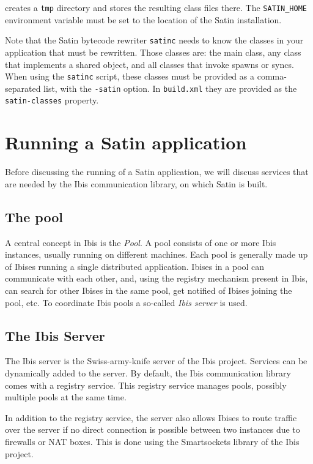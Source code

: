 \documentclass[a4paper,10pt]{article}
\begin{document}
creates a \texttt{tmp} directory and stores the resulting class files there.
The \texttt{SATIN\_HOME} environment variable must be set to the location of
the Satin installation.

Note that the Satin bytecode rewriter \texttt{satinc} needs to know the
classes in your application that must be rewritten.
Those classes are: the main class, any class that implements a shared object,
and all classes that invoke spawns or syncs.
When using the \texttt{satinc} script, these classes must be provided as
a comma-separated list, with the \texttt{-satin} option. In
\texttt{build.xml} they are provided as the \texttt{satin-classes} property.

\section{Running a Satin application}

Before discussing
the running of a Satin application, we will discuss services that are
needed by the Ibis communication library, on which Satin is built.

\subsection{The pool}

A central concept in Ibis is the \emph{Pool}. A pool consists of one or
more Ibis instances, usually running on different machines. Each pool is
generally made up of Ibises running a single distributed application.
Ibises in a pool can communicate with each other, and, using the
registry mechanism present in Ibis, can search for other Ibises in the
same pool, get notified of Ibises joining the pool, etc. To
coordinate Ibis pools a so-called \emph{Ibis server} is used.

\subsection{The Ibis Server}

The Ibis server is the Swiss-army-knife server of the Ibis project.
Services can be dynamically added to the server. By default, the Ibis
communication library comes with a registry service. This registry
service manages pools, possibly multiple pools at the same time.

In addition to the registry service, the server also allows
Ibises to route traffic over the server if no direct connection is
possible between two instances due to firewalls or NAT boxes. This is
done using the Smartsockets library of the Ibis project.
\end{document}
